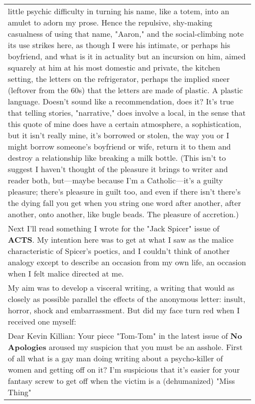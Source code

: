 \begin{longtable}[]{@{}l@{}}
\begin{minipage}[t]{0.97\columnwidth}
little psychic difficulty in turning his name, like a totem, into an
amulet to adorn my prose. Hence the repulsive, shy-making casualness of
using that name, "Aaron," and the social-climbing note its use strikes
here, as though I were his intimate, or perhaps his boyfriend, and what
is it in actuality but an incursion on him, aimed squarely at him at his
most domestic and private, the kitchen setting, the letters on the
refrigerator, perhaps the implied sneer (leftover from the 60s) that the
letters are made of plastic. A plastic language. Doesn't sound like a
recommendation, does it? It's true that telling stories, "narrative,"
does involve a local, in the sense that this quote of mine does have a
certain atmosphere, a sophistication, but it isn't really mine, it's
borrowed or stolen, the way you or I might borrow someone's boyfriend or
wife, return it to them and destroy a relationship like breaking a milk
bottle. (This isn't to suggest I haven't thought of the pleasure it
brings to writer and reader both, but---maybe because I'm a
Catholic---it's a guilty pleasure; there's pleasure in guilt too, and
even if there isn't there's the dying fall you get when you string one
word after another, after another, onto another, like bugle beads. The
pleasure of accretion.)\strut
\end{minipage}\tabularnewline
\begin{minipage}[t]{0.97\columnwidth}\raggedright
Next I'll read something I wrote for the "Jack Spicer" issue of
\textbf{ACTS}. My intention here was to get at what I saw as the malice
characteristic of Spicer's poetics, and I couldn't think of another
analogy except to describe an occasion from my own life, an occasion
when I felt malice directed at me.\strut
\end{minipage}\tabularnewline
\begin{minipage}[t]{0.97\columnwidth}\raggedright
My aim was to develop a visceral writing, a writing that would as
closely as possible parallel the effects of the anonymous letter:
insult, horror, shock and embarrassment. But did my face turn red when I
received one myself:\strut
\end{minipage}\tabularnewline
\begin{minipage}[t]{0.97\columnwidth}\raggedright
Dear Kevin Killian: Your piece "Tom-Tom" in the latest issue of
\textbf{No Apologies} aroused my suspicion that you must be an asshole.
First of all what is a gay man doing writing about a psycho-killer of
women and getting off on it? I'm suspicious that it's easier for your
fantasy screw to get off when the victim is a (dehumanized) "Miss Thing"

\end{minipage}
\end{longtable}
